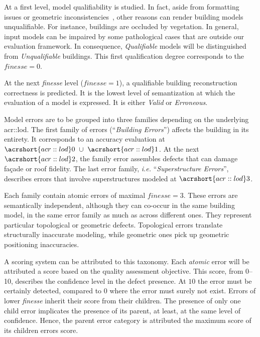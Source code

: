 \documentclass[runningheads]{llncs}
\begin{document}
At a first level, model qualifiability is studied. In fact, aside from formatting issues or geometric inconsistencies~\cite{ledoux2018val3dity}, other reasons can render building models unqualifiable. For instance, buildings are occluded by vegetation. In general, input models can be impaired by some pathological cases that are outside our evaluation framework. In consequence, \textit{Qualifiable} models will be distinguished from \textit{Unqualifiable} buildings. This first qualification degree corresponds to the $\textit{finesse} = 0$.

At the next \textit{finesse} level ($\textit{finesse} = 1$), a qualifiable building reconstruction correctness is predicted. It is the lowest level of semantization at which the evaluation of a model is expressed. It is either \textit{Valid} or \textit{Erroneous}.

Model errors are to be grouped into three families depending on the underlying \acrshort{acr::lod}. The first family of errors (``\textit{Building Errors}'') affects the building in its entirety. It corresponds to an accuracy evaluation at $\acrshort{acr::lod}0\text{ } \cup \text{ }\acrshort{acr::lod}1$. At the next $\acrshort{acr::lod}2$, the family error assembles defects that can damage fa\c{c}ade or roof fidelity. The last error family, \textit{i.e.} ``\textit{Superstructure Errors}'', describes errors that involve superstructures modeled at $\acrshort{acr::lod}3$.

Each family contain atomic errors of maximal $\textit{finesse} = 3$. These errors are semantically independent, although they can co-occur in the same building model, in the same error family as much as across different ones. They represent particular topological or geometric defects. Topological errors translate structurally inaccurate modeling, while geometric ones pick up geometric positioning inaccuracies.

A scoring system can be attributed to this taxonomy. Each \textit{atomic} error will be attributed a score based on the quality assessment objective. This score, from \SIrange{0}{10}{}, describes the confidence level in the defect presence. At $10$ the error must be certainly detected, compared to $0$ where the error must surely not exist. Errors of lower \textit{finesse} inherit their score from their children. The presence of only one child error implicates the presence of its parent, at least, at the same level of confidence. Hence, the parent error category is attributed the maximum score of its children errors score.
\end{document}
